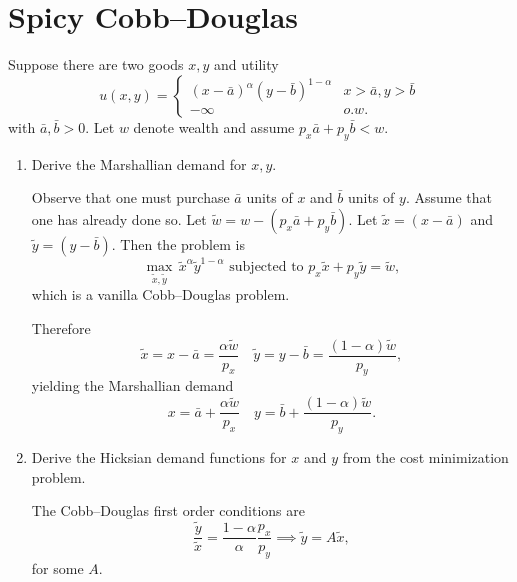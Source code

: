 \documentclass[11pt]{article}
\begin{document}
\section{Spicy Cobb--Douglas}

Suppose there are two goods $x,y$ and utility \[
u(x,y) = \begin{cases}
     (x-\bar a)^\alpha (y-\bar b)^{1- \alpha} & x > \bar a, y > \bar b \\
     -\infty & o.w.
\end{cases}
\]
with $\bar a, \bar b > 0.$ Let $w$ denote wealth and assume $p_x \bar a + p_y \bar b < w$.  
\begin{enumerate}
    \item Derive the Marshallian demand for $x,y$. 
    \begin{sol}
        Observe that one must purchase $\bar a$ units of $x$ and $\bar b$ units of $y$. Assume that one has already done so. Let $\tilde w = w - (p_x \bar a + p_y \bar b)$. Let $\tilde x = (x-\bar a)$ and $\tilde y = (y-\bar b)$. Then the problem is \[
        \max_{\tilde x, \tilde y} \, \tilde x ^{\alpha} \tilde y^{1-\alpha}\text{ subjected to } p_x \tilde x + p_y\tilde y = \tilde w,
        \]
        which is a vanilla Cobb--Douglas problem.
        
        Therefore \[
        \tilde x = x-\bar a = \frac{\alpha \tilde w}{p_x}\quad \tilde y = y-\bar b = \frac{(1-\alpha)\tilde w}{p_y},
        \]
        yielding the Marshallian demand \[
        x = \bar a + \frac{\alpha \tilde w}{p_x} \quad y = \bar b + \frac{(1-\alpha) \tilde w}{p_y}.
        \]        
    \end{sol}
    
    \item Derive the Hicksian demand functions for $x$ and $y$ from the cost minimization problem. 
    \begin{sol}
        The Cobb--Douglas first order conditions are \[
        \frac{\tilde y}{\tilde x} = \frac{1- \alpha}{\alpha}\frac{p_x}{p_y} \implies \tilde y = A \tilde x,
        \]
        for some $A$.
        

\end{sol}
\end{enumerate}
\end{document}
